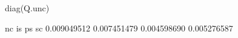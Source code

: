 \begin{Schunk}
\begin{Sinput}
 diag(Q.unc)
\end{Sinput}
\begin{Soutput}
         nc          is          ps          sc 
0.009049512 0.007451479 0.004598690 0.005276587 
\end{Soutput}
\end{Schunk}
